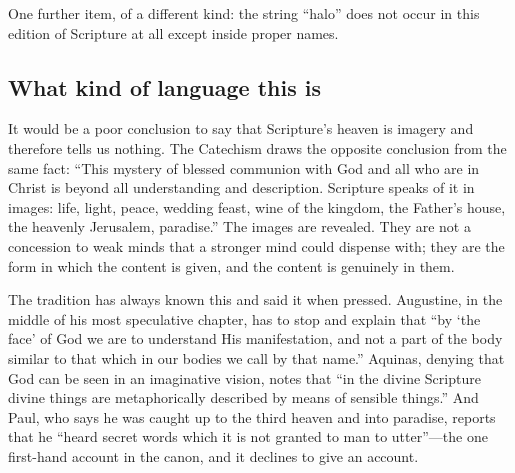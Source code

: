 One further item, of a different kind: the string ``halo'' does not occur in this edition of Scripture at all except inside proper names.

\subsection{What kind of language this is}

It would be a poor conclusion to say that Scripture's heaven is imagery and therefore tells us nothing. The Catechism draws the opposite conclusion from the same fact: ``This mystery of blessed communion with God and all who are in Christ is beyond all understanding and description. Scripture speaks of it in images: life, light, peace, wedding feast, wine of the kingdom, the Father's house, the heavenly Jerusalem, paradise.'' The images are revealed. They are not a concession to weak minds that a stronger mind could dispense with; they are the form in which the content is given, and the content is genuinely in them.

The tradition has always known this and said it when pressed. Augustine, in the middle of his most speculative chapter, has to stop and explain that ``by `the face' of God we are to understand His manifestation, and not a part of the body similar to that which in our bodies we call by that name.'' Aquinas, denying that God can be seen in an imaginative vision, notes that ``in the divine Scripture divine things are metaphorically described by means of sensible things.'' And Paul, who says he was caught up to the third heaven and into paradise, reports that he ``heard secret words which it is not granted to man to utter''---the one first-hand account in the canon, and it declines to give an account.

